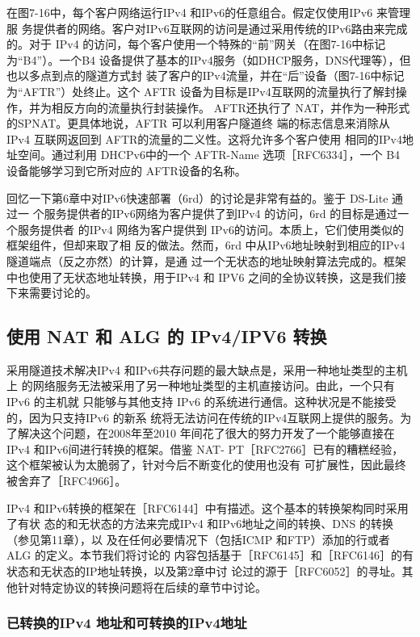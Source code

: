 在图7-16中，每个客户网络运行IPv4 和IPv6的任意组合。假定仅使用IPv6 来管理服
务提供者的网络。客户对IPv6互联网的访问是通过采用传统的IPv6路由来完成的。对于
IPv4 的访问，每个客户使用一个特殊的“前”网关（在图7-16中标记为“B4”）。一个B4
设备提供了基本的IPv4服务（如DHCP服务，DNS代理等），但也以多点到点的隧道方式封
装了客户的IPv4流量，并在“后”设备（图7-16中标记为“AFTR”）处终止。这个 AFTR
设备为目标是IPv4互联网的流量执行了解封操作，并为相反方向的流量执行封装操作。
AFTR还执行了 NAT，并作为一种形式的SPNAT。更具体地说，AFTR 可以利用客户隧道终
端的标志信息来消除从 IPv4 互联网返回到 AFTR的流量的二义性。这将允许多个客户使用
相同的IPv4地址空间。通过利用 DHCPv6中的一个 AFTR-Name 选项［RFC6334］，一个 B4
设备能够学习到它所对应的 AFTR设备的名称。

回忆一下第6章中对IPv6快速部署（6rd）的讨论是非常有益的。鉴于 DS-Lite 通过一
个服务提供者的IPv6网络为客户提供了到IPv4 的访问，6rd 的目标是通过一个服务提供者
的IPv4 网络为客户提供到 IPv6的访问。本质上，它们使用类似的框架组件，但却来取了相
反的做法。然而，6rd 中从IPv6地址映射到相应的IPv4 隧道端点（反之亦然）的计算，是通
过一个无状态的地址映射算法完成的。框架中也使用了无状态地址转换，用于IPv4 和 IPV6
之间的全协议转换，这是我们接下来需要讨论的。

\subsection{使用 NAT 和 ALG 的 IPv4/IPV6 转换}

采用隧道技术解决IPv4 和IPv6共存问题的最大缺点是，采用一种地址类型的主机上
的网络服务无法被采用了另一种地址类型的主机直接访问。由此，一个只有IPv6 的主机就
只能够与其他支持 IPv6 的系统进行通信。这种状况是不能接受的，因为只支持IPv6 的新系
统将无法访问在传统的IPv4互联网上提供的服务。为了解决这个问题，在2008年至2010
年间花了很大的努力开发了一个能够直接在IPv4 和IPv6间进行转换的框架。借鉴 NAT-
PT［RFC2766］已有的糟糕经验，这个框架被认为太脆弱了，针对今后不断变化的使用也没有
可扩展性，因此最终被舍弃了［RFC4966］。

IPv4 和IPv6转换的框架在［RFC6144］中有描述。这个基本的转换架构同时采用了有状
态的和无状态的方法来完成IPv4 和IPv6地址之间的转换、DNS 的转换（参见第11章），以
及在任何必要情况下（包括ICMP 和FTP）添加的行或者ALG 的定义。本节我们将讨论的
内容包括基于［RFC6145］和［RFC6146］的有状态和无状态的IP地址转换，以及第2章中讨
论过的源于［RFC6052］的寻址。其他针对特定协议的转换问题将在后续的章节中讨论。

\subsubsection{已转换的IPv4 地址和可转换的IPv4地址}

